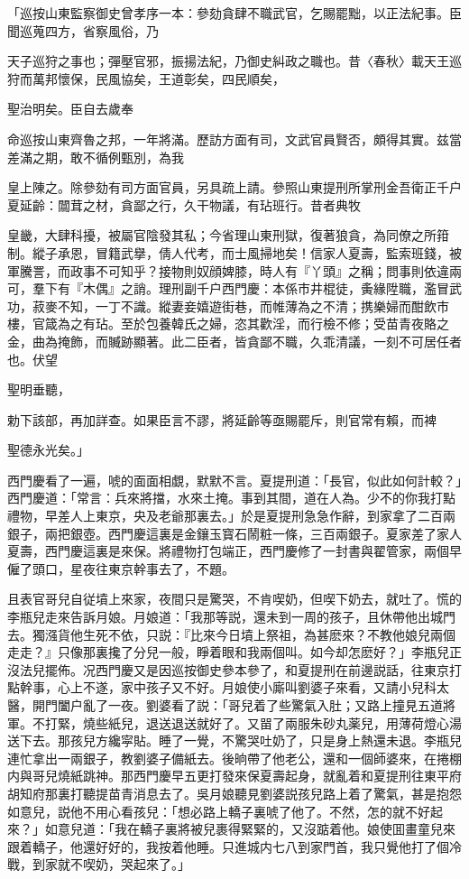 \begin{myquote}[\markfont]
「巡按山東監察御史曾孝序一本：參劾貪肆不職武官，乞賜罷黜，以正法紀事。臣聞巡蒐四方，省察風俗，乃

天子巡狩之事也；彈壓官邪，振揚法紀，乃御史糾政之職也。昔〈春秋〉載天王巡狩而萬邦懷保，民風協矣，王道彰矣，四民順矣，

聖治明矣。臣自去歲奉

命巡按山東齊魯之邦，一年將滿。歷訪方面有司，文武官員賢否，頗得其實。兹當差滿之期，敢不循例甄別，為我

皇上陳之。除參劾有司方面官員，另具疏上請。參照山東提刑所掌刑金吾衛正千户夏延齡：闒茸之材，貪鄙之行，久干物議，有玷班行。昔者典牧

皇畿，大肆科擾，被屬官陰發其私；今省理山東刑獄，復著狼貪，為同僚之所箝制。縱子承恩，冒籍武擧，倩人代考，而士風掃地矣！信家人夏壽，監索班錢，被軍騰詈，而政事不可知乎？接物則奴顔婢膝，時人有『丫頭』之稱；問事則依違兩可，羣下有『木偶』之誚。理刑副千户西門慶：本係市井棍徒，夤緣陞職，濫冒武功，菽麥不知，一丁不識。縱妻妾嬉遊街巷，而帷薄為之不清；携樂婦而酣飲市樓，官箴為之有玷。至於包養韓氏之婦，恣其歡淫，而行檢不修；受苗青夜賂之金，曲為掩飾，而贓跡顯著。此二臣者，皆貪鄙不職，久乖清議，一刻不可居任者也。伏望

聖明垂聽，

勅下該部，再加詳查。如果臣言不謬，將延齡等亟賜罷斥，則官常有賴，而裨

聖德永光矣。」
\end{myquote}

西門慶看了一遍，唬的面面相覷，默默不言。夏提刑道：「長官，似此如何計較？」西門慶道：「常言：兵來將擋，水來土掩。事到其間，道在人為。少不的你我打點禮物，早差人上東京，央及老爺那裏去。」於是夏提刑急急作辭，到家拿了二百兩銀子，兩把銀壺。西門慶這裏是金鑲玉寳石鬧粧一條，三百兩銀子。夏家差了家人夏壽，西門慶這裏是來保。將禮物打包端正，西門慶修了一封書與翟管家，兩個早僱了頭口，星夜往東京幹事去了，不題。

且表官哥兒自従墳上來家，夜間只是驚哭，不肯喫奶，但喫下奶去，就吐了。慌的李瓶兒走來告訴月娘。月娘道：「我那等説，還未到一周的孩子，且休帶他出城門去。獨漒貨他生死不依，只説：『比來今日墳上祭祖，為甚麽來？不教他娘兒兩個走走？』只像那裏攙了分兒一般，睜着眼和我兩個叫。如今却怎麽好？」李瓶兒正沒法兒擺佈。况西門慶又是因巡按御史參本參了，和夏提刑在前邊説話，往東京打點幹事，心上不遂，家中孩子又不好。月娘使小廝叫劉婆子來看，又請小兒科太醫，開門闔户亂了一夜。劉婆看了説：「哥兒着了些驚氣入肚；又路上撞見五道將軍。不打緊，燒些紙兒，退送退送就好了。又㽞了兩服朱砂丸薬兒，用薄荷燈心湯送下去。那孩兒方纔寜貼。睡了一覺，不驚哭吐奶了，只是身上熱還未退。李瓶兒連忙拿出一兩銀子，教劉婆子備紙去。後晌帶了他老公，還和一個師婆來，在捲棚内與哥兒燒紙跳神。那西門慶早五更打發來保夏壽起身，就亂着和夏提刑往東平府胡知府那裏打聽提苗青消息去了。吳月娘聽見劉婆説孩兒路上着了驚氣，甚是抱怨如意兒，説他不用心看孩兒：「想必路上轎子裏唬了他了。不然，怎的就不好起來？」如意兒道：「我在轎子裏將被兒裹得緊緊的，又沒踮着他。娘使囬畫童兒來跟着轎子，他還好好的，我按着他睡。只進城内七八到家門首，我只覺他打了個冷戰，到家就不喫奶，哭起來了。」

